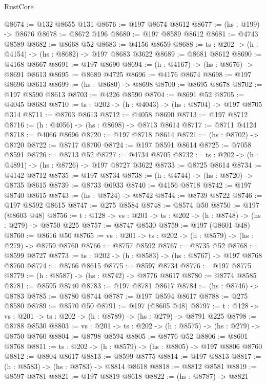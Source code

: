 \begin{lexlean}{RustCore}
\begin{coremodule}
@8674 := @132 @8655 @131
@8676 := @197 @8674 @8612
@8677 := (hs : @199) -> @8676
@8678 := @8672 @196
@8680 := @197 @8589 @8612
@8681 := @4743 @8589
@8682 := @8668 @52
@8683 := @4156 @8659
@8688 := {ts : @202} -> (h : @4154) -> (hs : @8682) -> @197 @8683 @3622
@8689 := @8681 @8612
@8690 := @4168 @8667
@8691 := @197 @8690
@8694 := (h : @4167) -> (hs : @8676) -> @8691 @8613
@8695 := @8689 @4725
@8696 := @4176 @8674
@8698 := @197 @8696 @8613
@8699 := (hs : @8680) -> @8698
@8700 := @8695 @8678
@8702 := @197 @8590 @8613
@8703 := @4226 @8590
@8704 := @8691 @52
@8705 := @4045 @8683
@8710 := {ts : @202} -> (h : @4043) -> (hs : @8704) -> @197 @8705 @314
@8711 := @8703 @8613
@8712 := @4058 @8690
@8713 := @197 @8712
@8716 := (h : @4056) -> (hs : @8698) -> @8713 @8614
@8717 := @8711 @4124
@8718 := @4066 @8696
@8720 := @197 @8718 @8614
@8721 := (hs : @8702) -> @8720
@8722 := @8717 @8700
@8724 := @197 @8591 @8614
@8725 := @7058 @8591
@8726 := @8713 @52
@8727 := @4734 @8705
@8732 := {ts : @202} -> (h : @4891) -> (hs : @8726) -> @197 @8727 @3622
@8733 := @8725 @8614
@8734 := @4142 @8712
@8735 := @197 @8734
@8738 := (h : @4744) -> (hs : @8720) -> @8735 @8615
@8739 := @8733 @6933
@8740 := @4156 @8718
@8742 := @197 @8740 @8615
@8743 := (hs : @8724) -> @8742
@8744 := @8739 @8722
@8746 := @197 @8592 @8615
@8747 := @275 @8584
@8748 := @8574 @50
@8750 := @197 (@8603 @48)
@8756 := {t : @128} -> {vs : @201} -> {ts : @202} -> (h : @8748) -> (hs : @279) -> @8750 @225
@8757 := @8747 @8530
@8759 := @197 (@8601 @48)
@8760 := @8616 @50
@8765 := {vs : @201} -> {ts : @202} -> (h : @8579) -> (hs : @279) -> @8759 @8760
@8766 := @8757 @8592
@8767 := @8735 @52
@8768 := @8599 @8727
@8773 := {ts : @202} -> (h : @8583) -> (hs : @8767) -> @197 @8768 @8760
@8774 := @8766 @8615
@8775 := @8597 @8734
@8776 := @197 @8775
@8779 := (h : @8587) -> (hs : @8742) -> @8776 @8617
@8780 := @8774 @8585
@8781 := @8595 @8740
@8783 := @197 @8781 @8617
@8784 := (hs : @8746) -> @8783
@8785 := @8780 @8744
@8787 := @197 @8594 @8617
@8788 := @275 @8580
@8789 := @8570 @50
@8791 := @197 (@8605 @48)
@8797 := {t : @128} -> {vs : @201} -> {ts : @202} -> (h : @8789) -> (hs : @279) -> @8791 @225
@8798 := @8788 @8530
@8803 := {vs : @201} -> {ts : @202} -> (h : @8575) -> (hs : @279) -> @8750 @8760
@8804 := @8798 @8594
@8805 := @8776 @52
@8806 := @8601 @8768
@8811 := {ts : @202} -> (h : @8579) -> (hs : @8805) -> @197 @8806 @8760
@8812 := @8804 @8617
@8813 := @8599 @8775
@8814 := @197 @8813
@8817 := (h : @8583) -> (hs : @8783) -> @8814 @8618
@8818 := @8812 @8581
@8819 := @8597 @8781
@8821 := @197 @8819 @8618
@8822 := (hs : @8787) -> @8821

\end{coremodule}
\end{lexlean}
